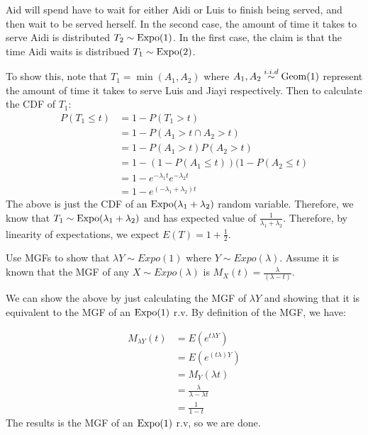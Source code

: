 \documentclass[11pt]{article}
\begin{document}
\begin{solution}
Aid will spend have to wait for either Aidi or Luis to finish being served, and then wait to be served herself. In the second case, the amount of time it takes to serve Aidi is distributed $T_2 \sim \textrm{Expo}(1)$. In the first case, the claim is that the time Aidi waits is distribued $T_1 \sim \textrm{Expo}(2)$.

To show this, note that $T_1 = \min(A_1,A_2)$ where $A_1, A_2 \stackrel{i.i.d}{\sim} \textrm{Geom}(1)$ represent the amount of time it takes to serve Luis and Jiayi respectively. Then to calculate the CDF of $T_1$:
\begin{align*}
P(T_1 \leq t) &= 1 - P(T_1 > t) \\
&= 1 - P(A_1 > t \cap A_2 > t) \\
&= 1 - P(A_1 > t)P(A_2 > t) \\
&= 1 - (1 - P(A_1 \leq t))(1 - P(A_2 \leq t) \\
&= 1 - e^{-\lambda_1t}e^{-\lambda_2t} \\
&= 1 - e^{(-\lambda_1 + \lambda_2)t}
\end{align*}
The above is just the CDF of an $\textrm{Expo}(\lambda_1 + \lambda_2)$ random variable. Therefore, we know that $T_1 \sim \textrm{Expo}(\lambda_1 + \lambda_2)$ and has expected value of $\frac{1}{\lambda_1 + \lambda_2}$. Therefore, by linearity of expectations, we expect $E(T) = 1 + \frac{1}{2}$.
\end{solution}

\begin{exercise}
Use MGFs to show that $\lambda Y \sim Expo(1)$ where $Y \sim Expo(\lambda)$. Assume it is known that the MGF of any $X \sim Expo(\lambda)$ is $M_X(t) = \frac{\lambda}{(\lambda - t)}$.

\begin{solution}
We can show the above by just calculating the MGF of $\lambda Y$ and showing that it is equivalent to the MGF of an $\textrm{Expo}(1)$ r.v. By definition of the MGF, we have:

\begin{align*}
M_{\lambda Y}(t) &= E(e^{t\lambda Y}) \\
&= E(e^{(t\lambda)Y}) \\
&= M_{Y}(\lambda t) \\
&= \frac{\lambda}{\lambda - \lambda t} \\
&= \frac{1}{1 - t}
\end{align*}
The results is the MGF of an $\textrm{Expo}(1)$ r.v, so we are done.
\end{solution}
\end{exercise}
\end{document}
